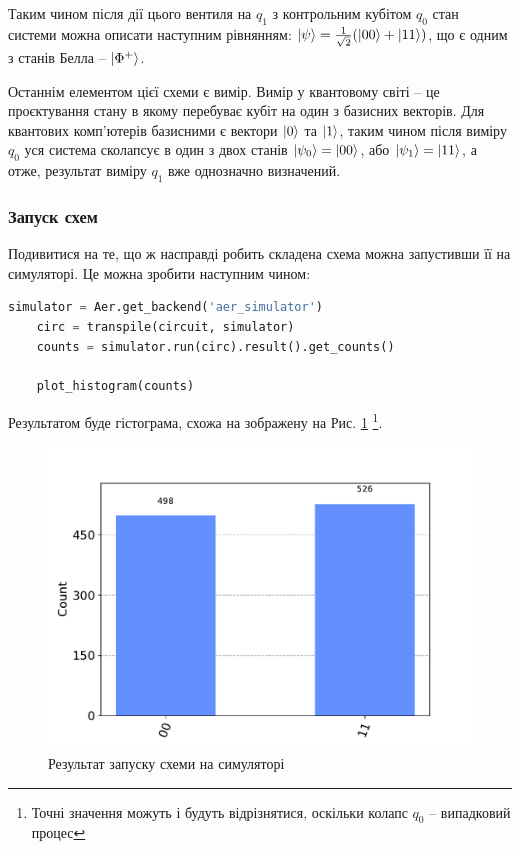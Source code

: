 \documentclass{article}
\begin{document}
Таким чином після дії цього вентиля на $q_1$ з контрольним кубітом $q_0$ стан системи можна описати наступним рівнянням: $\ket{\psi} =\frac{1}{\sqrt{2}} (\ket{00}+\ket{11})$, що є одним з станів Белла -- $\ket{\Phi^+}$.

Останнім елементом цієї схеми є вимір. 
Вимір у квантовому світі -- це проєктування стану в якому перебуває кубіт на один з базисних векторів. 
Для квантових комп'ютерів базисними є вектори $\ket{0}$ та $\ket{1}$, таким чином після виміру $q_0$ уся система сколапсує в один з двох станів $\ket{\psi_0}=\ket{00}$, або $\ket{\psi_1}=\ket{11}$, а отже, результат виміру $q_1$ вже однозначно визначений.

\subsubsection{Запуск схем}

Подивитися на те, що ж насправді робить складена схема можна запустивши її на симуляторі. 
Це можна зробити наступним чином:

\begin{lstlisting}[language=Python]
    simulator = Aer.get_backend('aer_simulator')
    circ = transpile(circuit, simulator)
    counts = simulator.run(circ).result().get_counts()

    plot_histogram(counts)
\end{lstlisting}

Результатом буде гістограма, схожа на зображену на Рис. \ref{simulator_results} \footnote{Точні значення можуть і будуть відрізнятися, оскільки колапс $q_0$ -- випадковий процес}.

\begin{figure}[bh]
    \centering
    \includegraphics[scale=0.3]{results}
    \caption{Результат запуску схеми на симуляторі}
    \label{simulator_results}
\end{figure}
\end{document}
